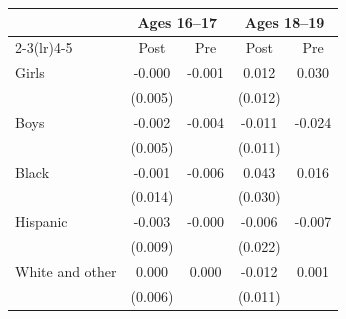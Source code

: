 \begin{tabular}{lcccc}
\toprule
 & \multicolumn{2}{c}{Ages 16--17} & \multicolumn{2}{c}{Ages 18--19} \\
\cmidrule(lr){2-3}\cmidrule(lr){4-5}
 & Post & Pre & Post & Pre \\
\midrule
Girls & -0.000 & -0.001 & 0.012 & 0.030 \\
 & (0.005) &  & (0.012) &  \\
Boys & -0.002 & -0.004 & -0.011 & -0.024 \\
 & (0.005) &  & (0.011) &  \\
Black & -0.001 & -0.006 & 0.043 & 0.016 \\
 & (0.014) &  & (0.030) &  \\
Hispanic & -0.003 & -0.000 & -0.006 & -0.007 \\
 & (0.009) &  & (0.022) &  \\
White and other & 0.000 & 0.000 & -0.012 & 0.001 \\
 & (0.006) &  & (0.011) &  \\
\bottomrule
\end{tabular}
